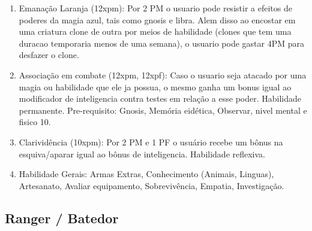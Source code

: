 \begin{enumerate}
	\item Emanação Laranja (12xpm): Por 2 PM o usuario pode resistir a efeitos de poderes da magia azul, tais como gnosis e libra. Alem disso ao encostar em uma criatura clone de outra por meios de habilidade (clones que tem uma duracao temporaria menos de uma semana), o usuario pode gastar 4PM para desfazer o clone.

    \item Associação em combate (12xpm, 12xpf): Caso o usuario seja atacado por uma magia ou habilidade que ele ja possua, o mesmo ganha um bonus igual ao modificador de inteligencia contra testes em relação a esse poder. Habilidade permanente. Pre-requisito: Gnosis, Memória eidética, Observar, nivel mental e fisico 10.


	\item Clarividência (10xpm): Por 2 PM e 1 PF o usuário recebe um bônus na esquiva/aparar igual ao bônus de inteligencia. Habilidade reflexiva.

	\item Habilidade Gerais: Armas Extras, Conhecimento (Animais, Linguas), Artesanato, Avaliar equipamento, Sobrevivência, Empatia, Investigação. 
	
\end{enumerate}


\subsection{Ranger / Batedor} 

